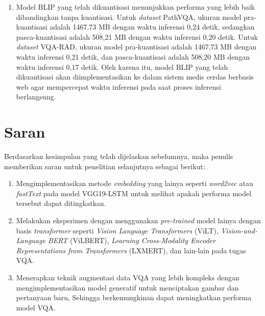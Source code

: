 \begin{enumerate}
    \item Model BLIP yang telah dikuantisasi menunjukkan performa yang lebih baik dibandingkan tanpa kuantisasi. Untuk \textit{dataset} PathVQA, ukuran model pra-kuantisasi adalah 1467.73 MB dengan waktu inferensi 0,24 detik, sedangkan pasca-kuantisasi adalah 508,21 MB dengan waktu inferensi 0,20 detik. Untuk \textit{dataset} VQA-RAD, ukuran model pra-kuantisasi adalah 1467,73 MB dengan waktu inferensi 0,21 detik, dan pasca-kuantisasi adalah 508,20 MB dengan waktu inferensi 0,17 detik. Oleh karena itu, model BLIP yang telah dikuantisasi akan diimplementasikan ke dalam sistem medis cerdas berbasis web agar mempercepat waktu inferensi pada saat proses inferensi berlangsung.



\end{enumerate}


\section{Saran}

\par Berdasarkan kesimpulan yang telah dijelaskan sebelumnya, maka penulis memberikan saran untuk penelitian selanjutnya sebagai berikut:

\begin{enumerate}

    \item Mengimplementasikan metode \textit{embedding} yang lainya seperti \textit{word2vec} atau \textit{fastText} pada model VGG19-LSTM untuk melihat apakah performa model tersebut dapat ditingkatkan.

    \item Melakukan eksperimen dengan menggunakan \textit{pre-trained} model lainya dengan basis \textit{transformer} seperti \textit{Vision Language Transformers} (ViLT), \textit{Vision-and-Language BERT} (ViLBERT), \textit{Learning Cross-Modality Encoder Representations from Transformers} (LXMERT), dan lain-lain pada tugas VQA.

    \item Menerapkan teknik augmentasi data VQA yang lebih kompleks dengan mengimplementasikan model generatif untuk menciptakan gambar dan pertanyaan baru, Sehingga berkemungkinan dapat meningkatkan performa model VQA.    

\end{enumerate}




\begin{comment}

\end{comment}